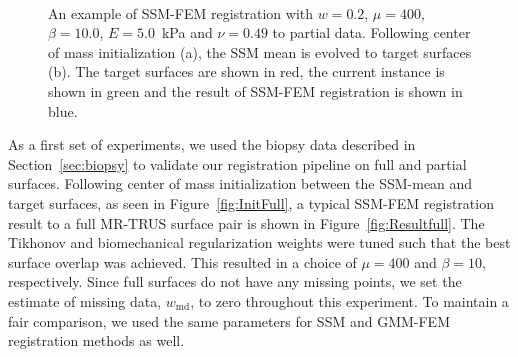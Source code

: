 \documentclass[journal]{IEEEtran}
\begin{document}
\begin{figure}[t]
	\centering
	\\
	\caption{An example of SSM-FEM registration with $w=0.2$, $\mu=400$, $\beta=10.0$, $E=5.0$~kPa and $\nu=0.49$ to partial data. Following center of mass initialization (a), the SSM mean is evolved to target surfaces (b). The target surfaces are shown in red, the current instance is shown in green and the result of SSM-FEM registration is shown in blue.}\label{fig:RegPartial}
\end{figure}
As a first set of experiments, we used the biopsy data described in Section~\ref{sec:biopsy} to validate our registration pipeline on full and partial surfaces. Following center of mass initialization between the SSM-mean and target surfaces, as seen in Figure~\ref{fig:InitFull}, a typical SSM-FEM registration result to a full MR-TRUS surface pair is shown in Figure~\ref{fig:Resultfull}. The Tikhonov and biomechanical regularization weights were tuned such that the best surface overlap was achieved. This resulted in a choice of $\mu=400$ and $\beta=10$,  respectively. Since full surfaces do not have any missing points, we set the estimate of missing data, $w_\mathrm{md}$, to zero throughout this experiment. To maintain a fair comparison, we used the same parameters for SSM and GMM-FEM registration methods as well.
\end{document}
